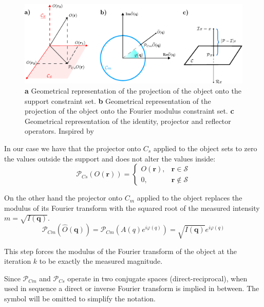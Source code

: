 \begin{figure}[H]
    \centering
    \includegraphics[width=\textwidth]{figures/Intro/projections.pdf}
    \caption{\textbf{a} Geometrical representation of the projection of the object onto the support constraint set.  
    \textbf{b} Geometrical representation of the projection of the object onto the Fourier modulus constraint set.
    \textbf{c} Geometrical representation of the identity, projector and reflector operators. Inspired by \cite{marchesini_unified_2007}}
    \label{fig:projections}
\end{figure}

In our case we have that the projector onto $C_s$ applied to the object sets to zero the values outside the support and does not 
alter the values inside: 
\begin{equation}
    \mathcal{P}_{Cs}(O(\mathbf{r})) = 
    \begin{cases}
        O(\mathbf{r}), & \mathbf{r} \in \mathcal{S} \\
        0,  &  \mathbf{r} \notin \mathcal{S}
     \end{cases}
\end{equation}

On the other hand the projector onto $C_m$ applied to the object replaces the modulus of its Fourier transform with the 
squared root of the measured intensity $m = \sqrt{I(\mathbf{q})}$. 
\begin{equation}
    \mathcal{P}_{Cm}(\widehat{O}(\mathbf{q})) = \mathcal{P}_{Cm}(A(q)e^{i\varphi(q)}) = \sqrt{I(\mathbf{q})}e^{i\varphi(q)}
    \label{eq:modulus_projection}
\end{equation}

This step forces the modulus of the Fourier transform of the object at the iteration $k$ to be exactly the measured magnitude.  

Since $\mathcal{P}_{Cm}$ and $\mathcal{P}_{Cs}$ operate in two conjugate spaces (direct-reciprocal), when used in sequence 
a direct or inverse Fourier transform is implied in between. The symbol will be omitted to simplify the notation. 


